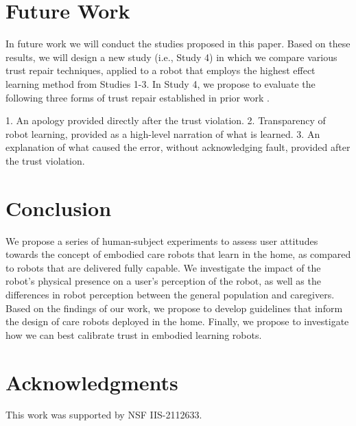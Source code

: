 \documentclass[letterpaper]{article} %
\begin{document}
\vspace{-1.66mm}
\section{Future Work}
\label{sec:futurework}
In future work we will conduct the studies proposed in this paper. Based on these results, we will design a new study (i.e., Study 4) in which we compare various trust repair techniques, applied to a robot that employs the highest effect learning method from Studies 1-3. In Study 4, we propose to evaluate the following three forms of trust repair established in prior work \cite{de_visser_towards_2020, baker_toward_2018, robinette_timing_2015, kim_repairing_2013}.

\begin{enumerate}
1. An apology provided directly after the trust violation.
2. Transparency of robot learning, provided as a high-level narration of what is learned.
3. An explanation of what caused the error, without acknowledging fault, provided after the trust violation.
\end{enumerate}

\section{Conclusion}
\label{sec:conclusion}
We propose a series of human-subject experiments to assess user attitudes towards the concept of embodied care robots that learn in the home, as compared to robots that are delivered fully capable. We investigate the impact of the robot's physical presence on a user's perception of the robot, as well as the differences in robot perception between the general population and caregivers. Based on the findings of our work, we propose to develop guidelines that inform the design of care robots deployed in the home. Finally, we propose to investigate how we can best calibrate trust in embodied learning robots.

\section{Acknowledgments}
This work was supported by NSF IIS-2112633.
\end{document}
